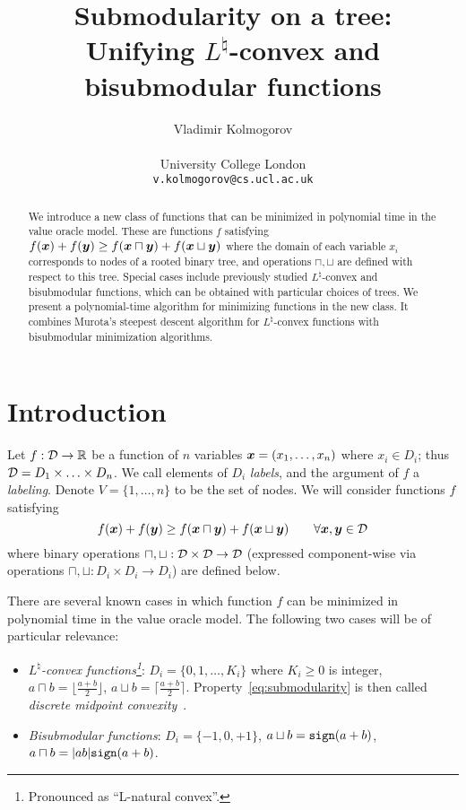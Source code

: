 \documentclass[11pt,onecolumn]{article}
\def\D{{\cal D}}
\def\sign{\texttt{sign~\!\!\!}}
\newcommand{\bx}{\mbox{\boldmath $x$}}
\newcommand{\by}{\mbox{\boldmath $y$}}
\begin{document}
\title{Submodularity on a tree: \\ Unifying $L^\natural$-convex and bisubmodular functions}
\author{Vladimir Kolmogorov \\ ~ \\ \normalsize University College London \\ {\normalsize\tt v.kolmogorov@cs.ucl.ac.uk} }
\date{}

\maketitle              
\begin{abstract}
We introduce a new class of functions that can be minimized in polynomial time in the value oracle model.
These are functions $f$ satisfying $f(\bx)+f(\by)\ge f(\bx \sqcap \by)+f(\bx \sqcup \by)$
where the domain of each variable $x_i$ corresponds to nodes of a rooted binary tree, and 
operations $\sqcap,\sqcup$ are defined with respect to this tree.
Special cases include previously studied $L^\natural$-convex and bisubmodular functions,
which can be obtained with particular choices of trees.
We present a polynomial-time algorithm for minimizing functions in the new class.
It combines Murota's steepest descent algorithm for $L^\natural$-convex functions
with bisubmodular minimization algorithms.

\end{abstract}
\section{Introduction}\label{sec:intro}
Let $f:\D\rightarrow \mathbb R$ be a function of $n$ variables $\bx=(x_1,\ldots,x_n)$ where $x_i\in D_i$;
thus $\D=D_1\times\ldots\times D_n$. We call elements of $D_i$ {\em labels}, and the argument of $f$ a {\em labeling}. 
Denote $V=\{1,\ldots,n\}$ to be the set of nodes. 
We will consider functions $f$ satisfying
\begin{equation}
f(\bx)+f(\by)\ge f(\bx \sqcap \by) + f(\bx \sqcup \by) \qquad \forall \bx,\by\in \D
\label{eq:submodularity}
\end{equation}
where binary operations $\sqcap,\sqcup:\D\times \D\rightarrow \D$ (expressed component-wise via operations $\sqcap,\sqcup:D_i\times D_i\rightarrow D_i$)
are defined below.

There are several known cases in which function $f$ can be minimized in polynomial time in the value oracle model.
The following two cases will be of particular relevance:
\begin{itemize}
\item {\em $L^\natural$-convex functions\footnote{Pronounced as ``L-natural convex''.}}: $D_i=\{0,1,\ldots,K_i\}$ where $K_i\ge 0$ is integer, 
$a\sqcap b=\lfloor \frac{a+b}{2} \rfloor$,
$a\sqcup b=\lceil \frac{a+b}{2} \rceil$. Property~\eqref{eq:submodularity} is then called {\em discrete midpoint convexity}~\cite{Murota:book}.
\item {\em Bisubmodular functions}: $D_i=\{-1,0,+1\}$, $a\sqcup b=\sign(a+b)$, 
$a\sqcap b=|ab|\sign(a+b)$.
\end{itemize}
\end{document}
